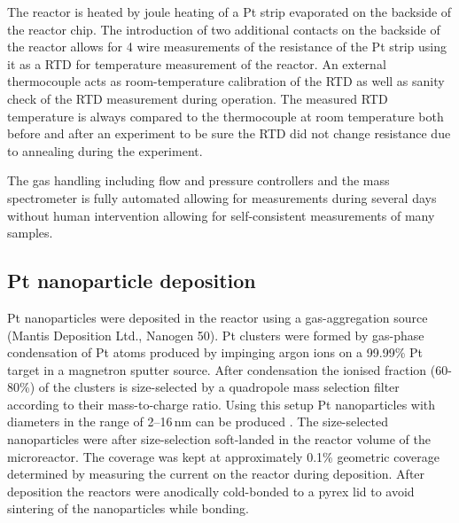 \documentclass[journal=jacsat,manuscript=article]{achemso}
\begin{document}
The reactor is heated by joule heating of a Pt strip evaporated on the backside
of the reactor chip. The introduction of two additional contacts on the
backside of the reactor allows for 4 wire measurements of the resistance of the
Pt strip using it as a RTD for temperature measurement of the reactor. An
external thermocouple acts as room-temperature calibration of the RTD as well
as sanity check of the RTD measurement during operation. The measured RTD
temperature is always compared to the thermocouple at room temperature both
before and after an experiment to be sure the RTD did not change resistance due
to annealing during the experiment.

The gas handling including flow and pressure controllers and the mass
spectrometer is fully automated allowing for measurements during several days
without human intervention allowing for self-consistent measurements of many
samples.

\subsection{Pt nanoparticle deposition}
Pt nanoparticles were deposited in the reactor using a gas-aggregation source
(Mantis Deposition Ltd., Nanogen 50). Pt clusters were formed by gas-phase
condensation of Pt atoms produced by impinging argon ions on a 99.99\% Pt
target in a magnetron sputter source. After condensation the ionised fraction
(60-80\%) of the clusters is size-selected by a quadropole mass selection
filter according to their mass-to-charge ratio. Using this setup Pt
nanoparticles with diameters in the range of 2--16\,nm can be produced
\cite{Nielsen2010,Nielsen2009}. The size-selected nanoparticles were after
size-selection soft-landed in the reactor volume of the microreactor. The
coverage was kept at approximately 0.1\% geometric coverage determined by
measuring the current on the reactor during deposition. After deposition the
reactors were anodically cold-bonded \cite{Vesborg2010} to a pyrex lid to avoid
sintering of the nanoparticles while bonding.


\end{document}

